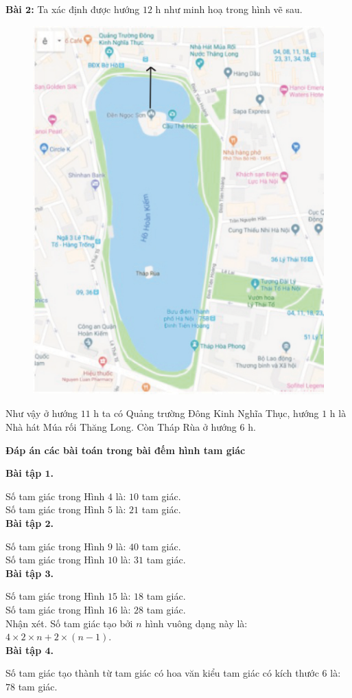 \textbf{\color{toancuabi}Bài $\pmb2$:} Ta xác định được hướng $12$ h như minh hoạ trong hình vẽ sau.
 \begin{figure}[H]
	\centering
	\vspace*{-5pt}
	\captionsetup{labelformat= empty, justification=centering}
	\includegraphics[width=0.45\linewidth]{bando}
	\vspace*{-5pt}
\end{figure}
 Như vậy ở hướng $11$ h ta có Quảng trường Đông Kinh Nghĩa Thục, hướng $1$ h là Nhà hát Múa rối Thăng Long. Còn Tháp Rùa ở hướng $6$ h.
\begin{center}
	\textbf{\color{toancuabi}Đáp án các bài toán trong bài đếm hình tam giác}
\end{center}
\textbf{\color{toancuabi}Bài tập $\pmb1$.}

Số tam giác trong Hình $4$ là: $10$ tam giác.\\
Số tam giác trong Hình $5$ là: $21$ tam giác.\\
\textbf{\color{toancuabi}Bài tập $\pmb2$.}

Số tam giác trong Hình $9$ là: $40$ tam giác.\\
Số tam giác trong Hình $10$ là: $31$ tam giác.\\
\textbf{\color{toancuabi}Bài tập $\pmb3$.}

Số tam giác trong Hình $15$ là: $18$ tam giác.\\
Số tam giác trong Hình $16$ là: $28$ tam giác.\\
Nhận xét. Số tam giác tạo bởi $n$ hình vuông dạng này là: $4\times 2\times n + 2\times (n-1)$.\\

\textbf{\color{toancuabi}Bài tập $\pmb4$.}

Số tam giác tạo thành từ tam giác có hoa văn kiểu tam giác có kích thước $6$ là: $78$ tam giác.

